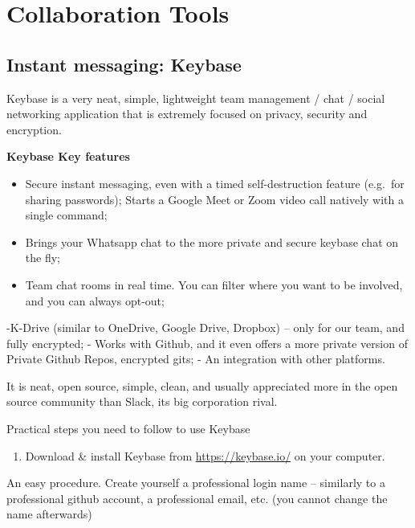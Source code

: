 \documentclass[
  fontsize=13pt,
  english,
  a4paper,
  openany, a4paper, oneside]{book}
\providecommand{\tightlist}{%
  \setlength{\itemsep}{0pt}\setlength{\parskip}{0pt}}
\begin{document}
\hypertarget{collaboration-tools}{%
\section{Collaboration Tools}\label{collaboration-tools}}

\hypertarget{keybase}{%
\subsection{Instant messaging: Keybase}\label{keybase}}

Keybase is a very neat, simple, lightweight team management / chat / social networking application that is extremely focused on privacy, security and encryption.

\textbf{Keybase Key features}

\begin{itemize}
\item
  Secure instant messaging, even with a timed self-destruction feature (e.g.~for sharing passwords);
  Starts a Google Meet or Zoom video call natively with a single command;
\item
  Brings your Whatsapp chat to the more private and secure keybase chat on the fly;
\item
  Team chat rooms in real time. You can filter where you want to be involved, and you can always opt-out;
\end{itemize}

-K-Drive (similar to OneDrive, Google Drive, Dropbox) -- only for our team, and fully encrypted;
- Works with Github, and it even offers a more private version of Private Github Repos, encrypted gits;
- An integration with other platforms.

It is neat, open source, simple, clean, and usually appreciated more in the open source community than Slack, its big corporation rival.

Practical steps you need to follow to use Keybase

\begin{enumerate}
\def\labelenumi{\arabic{enumi}.}
\tightlist
\item
  Download \& install Keybase from \url{https://keybase.io/} on your computer.
\end{enumerate}

An easy procedure. Create yourself a professional login name -- similarly to a professional github account, a professional email, etc. (you cannot change the name afterwards)
\end{document}
